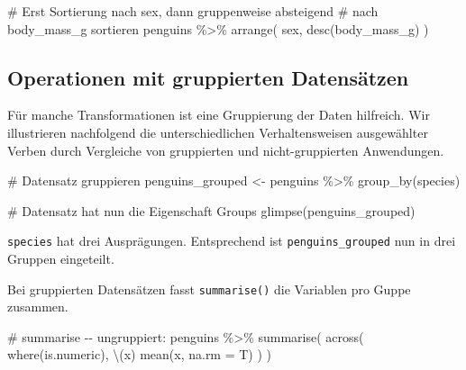 \documentclass[
  a4paper,
  DIV=11,
  oneside]{scrreprt}
\newenvironment{Shaded}{\begin{snugshade}}{\end{snugshade}}
\newcommand{\NormalTok}[1]{\textcolor[rgb]{0.00,0.23,0.31}{#1}}
\begin{document}
\begin{Shaded}
\begin{Highlighting}[]
\NormalTok{\# Erst Sortierung nach \textquotesingle{}sex\textquotesingle{}, dann gruppenweise absteigend }
\NormalTok{\# nach \textquotesingle{}body\_mass\_g\textquotesingle{} sortieren}
\NormalTok{penguins \%\textgreater{}\% }
\NormalTok{  arrange(}
\NormalTok{    sex, desc(body\_mass\_g)}
\NormalTok{  )}
\end{Highlighting}
\end{Shaded}

\hypertarget{operationen-mit-gruppierten-datensuxe4tzen}{%
\subsection{Operationen mit gruppierten
Datensätzen}\label{operationen-mit-gruppierten-datensuxe4tzen}}

Für manche Transformationen ist eine Gruppierung der Daten hilfreich.
Wir illustrieren nachfolgend die unterschiedlichen Verhaltensweisen
ausgewählter Verben durch Vergleiche von gruppierten und
nicht-gruppierten Anwendungen.

\begin{Shaded}
\begin{Highlighting}[]
\NormalTok{\# Datensatz gruppieren}
\NormalTok{penguins\_grouped \textless{}{-} penguins \%\textgreater{}\% }
\NormalTok{  group\_by(species)}

\NormalTok{\# Datensatz hat nun die Eigenschaft \textquotesingle{}Groups\textquotesingle{}}
\NormalTok{glimpse(penguins\_grouped)}
\end{Highlighting}
\end{Shaded}

\texttt{species} hat drei Ausprägungen. Entsprechend ist
\texttt{penguins\_grouped} nun in drei Gruppen eingeteilt.

Bei gruppierten Datensätzen fasst \texttt{summarise()} die Variablen pro
Guppe zusammen.

\begin{Shaded}
\begin{Highlighting}[]
\NormalTok{\# summarise {-}{-} ungruppiert:}
\NormalTok{penguins \%\textgreater{}\%}
\NormalTok{  summarise(}
\NormalTok{    across(}
\NormalTok{      where(is.numeric), \textbackslash{}(x) mean(x, na.rm = T)}
\NormalTok{      )}
\NormalTok{    )}
\end{Highlighting}
\end{Shaded}
\end{document}
